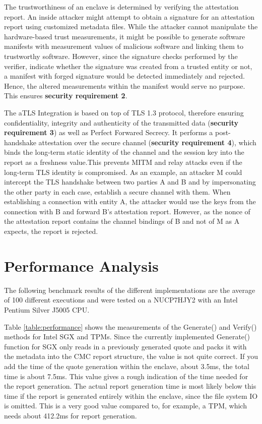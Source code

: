 The trustworthiness of an enclave is determined by verifying the attestation report. An inside attacker might attempt to obtain a signature for an attestation report using customized metadata files. While the attacker cannot manipulate the hardware-based trust measurements, it might be possible to generate software manifests with measurement values of malicious software and linking them to trustworthy software. 
However, since the signature checks performed by the verifier, indicate whether the signature was created from a trusted entity or not, a manifest with forged signature would be detected immediately and rejected. \cite{CMC_paper} 
Hence, the altered measurements within the manifest would serve no purpose. This ensures \textbf{security requirement 2}. 

The aTLS Integration is based on top of TLS 1.3 protocol, therefore ensuring confidentiality, integrity and authenticity of the transmitted data  (\textbf{security requirement 3}) as well as Perfect Forwared Secrecy. It performs a post-handshake attestation over the secure channel (\textbf{security requirement 4}), which binds the long-term static identity of the channel and the session key into the report as a freshness value.This prevents MITM and relay attacks even if the long-term TLS identity is compromised. 
As an example, an attacker M could intercept the TLS handshake between two parties A and B and by impersonating the other party in each case, establish a secure channel with them. When establishing a connection with entity A, the attacker would use the keys from the connection with B and forward B's attestation report. However, as the nonce of the attestation report contains the channel bindings of B and not of M as A expects, the report is rejected. \cite{CMC_paper}

\section{Performance Analysis}

The following benchmark results of the different implementations are the average of 100 different executions and were tested on a NUCP7HJY2 with an Intel Pentium Silver J5005 CPU. 

Table \ref{table:performance} shows the measurements of the Generate() and Verify() methods for Intel SGX and TPMs. Since the currently implemented Generate() function for SGX only reads in a previously generated quote and packs it with the metadata into the CMC report structure, the value is not quite correct. If you add the time of the quote generation within the enclave, about 3.5ms, the total time is about 7.5ms. This value gives a rough indication of the time needed for the report generation. The actual report generation time is most likely below this time if the report is generated entirely within the enclave, since the file system IO is omitted. This is a very good value compared to, for example, a TPM, which needs about 412.2ms for report generation. 

